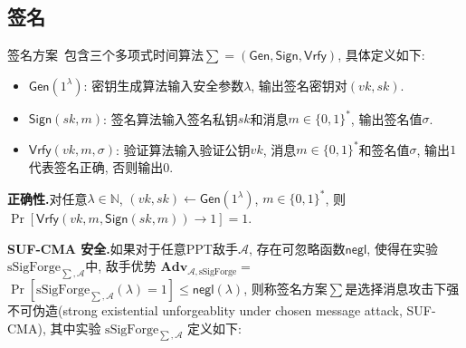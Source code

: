\documentclass[review]{jcr}
\begin{document}
\subsection{签名}
签名方案~\cite{AumayrEEFHMMR20}包含三个多项式时间算法$\sum=(\mathsf{Gen},\mathsf{Sign},\mathsf{Vrfy})$, 具体定义如下: 


\begin{itemize}
\item $\mathsf{Gen}(1^\lambda)$: 密钥生成算法输入安全参数$\lambda$, 输出签名密钥对$(vk,sk)$. 
\item $\mathsf{Sign}(sk,m)$: 签名算法输入签名私钥$sk$和消息$m\in\{0,1\}^*$, 输出签名值$\sigma$. 
\item $\mathsf{Vrfy}(vk,m,\sigma)$: 验证算法输入验证公钥$vk$, 消息$m\in\{0,1\}^*$和签名值$\sigma$, 输出$1$代表签名正确, 否则输出$0$. 
\end{itemize}

\begin{trivlist}
\item \textbf{正确性.}对任意$\lambda\in \mathbb{N}$, $(vk,sk)\leftarrow \mathsf{Gen}(1^\lambda)$, $m\in\{0,1\}^*$, 则$\Pr[\mathsf{Vrfy}(vk,m,\mathsf{Sign}(sk,m))\rightarrow 1]=1$. 
\end{trivlist}
\begin{trivlist}
\item \textbf{SUF-CMA 安全.}如果对于任意PPT敌手$\mathcal{A}$, 存在可忽略函数$\mathsf{negl}$, 使得在实验$\text{sSigForge}_{\sum,\mathcal{A}}$中, 敌手优势
$\textbf{Adv}_{\mathcal{A},\text{sSigForge}}=$$\Pr[\text{sSigForge}_{\sum,\mathcal{A}}(\lambda)=1]\leq \mathsf{negl}(\lambda)$, 则称签名方案$\sum$是选择消息攻击下强不可伪造(strong existential unforgeablity under chosen message attack, SUF-CMA), 其中实验 $\text{sSigForge}_{\sum,\mathcal{A}}$ 定义如下: 

\begin{center}
\end{center}

\end{trivlist}
\end{document}
